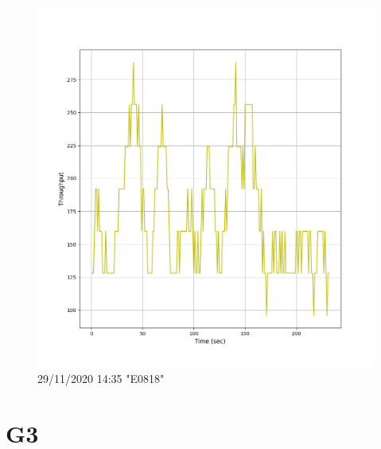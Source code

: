 \documentclass[hidelinks, 12pt, a4paper]{article}
\begin{document}
\begin{figure}[h!]
\centering
	\includegraphics[height=.38\textheight, width=\textwidth]{assets/session2/g2.png}
	\caption{29/11/2020 14:35 "E0818"} 
\end{figure}


\section{G3}
\end{document}
